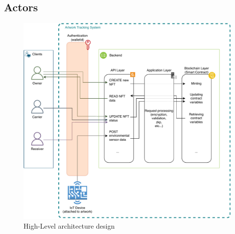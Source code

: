 \subsection{Actors}

\begin{figure}
    \centering
    \includegraphics[width=\textwidth]{diagrams/Architecture.drawio.pdf}
    \caption{High-Level architecture design}
    \label{fig:architecture}
\end{figure}
